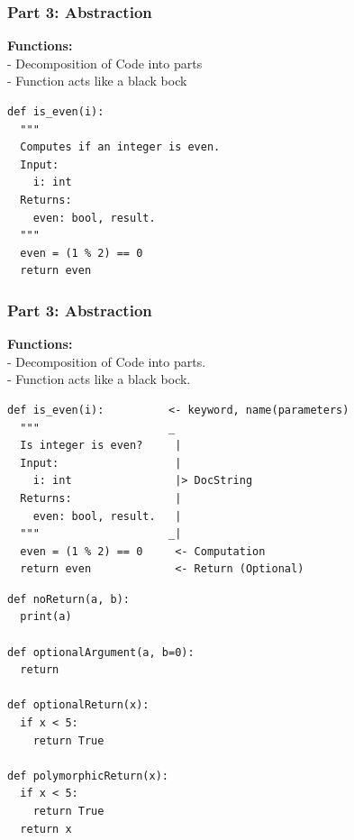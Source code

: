 \documentclass{beamer}
\begin{document}




\begin{frame}[fragile]
	\frametitle{\textbf{Part 3:} Abstraction}	
	\textbf{Functions:}\\
	- Decomposition of Code into parts\\
	- Function acts like a black bock
	\begin{verbatim}
def is_even(i):
  """
  Computes if an integer is even.
  Input:
  	i: int
  Returns:
  	even: bool, result.
  """
  even = (1 % 2) == 0
  return even
\end{verbatim}
\end{frame}

\begin{frame}[fragile]
	\frametitle{\textbf{Part 3:} Abstraction}	
	\textbf{Functions:}\\
	- Decomposition of Code into parts.\\
	- Function acts like a black bock.
	\begin{verbatim}
def is_even(i):          <- keyword, name(parameters)
  """                    _
  Is integer is even?     |
  Input:                  |
    i: int                |> DocString
  Returns:                |
    even: bool, result.   |
  """                    _|
  even = (1 % 2) == 0     <- Computation
  return even             <- Return (Optional)
	\end{verbatim}
\end{frame}


\begin{frame}[fragile]
	\begin{example}
\begin{verbatim}
def noReturn(a, b):
  print(a)

def optionalArgument(a, b=0):
  return

def optionalReturn(x):
  if x < 5:
    return True
 
def polymorphicReturn(x):
  if x < 5:
    return True
  return x
\end{verbatim}
	\end{example}
\end{frame}
\end{document}
